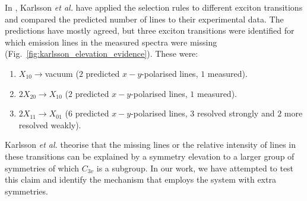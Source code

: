 In \cite{karlsson}, Karlsson \textit{et al.} have applied the selection rules to different exciton transitions and compared the predicted number of lines to their experimental data. The predictions have mostly agreed, but three exciton transitions were identified for which emission lines in the measured spectra were missing (Fig.~\ref{fig:karlsson_elevation_evidence}). These were:
\begin{enumerate}
\item $X_{10}\to $vacuum ($2$ predicted $x-y$-polarised lines, $1$ measured).
\item $2X_{20}\to X_{10}$ ($2$ predicted $x-y$-polarised lines, $1$ measured).
\item $2X_{11}\to X_{01}$ ($6$ predicted $x-y$-polarised lines, $3$ resolved strongly and $2$ more resolved weakly).
\end{enumerate}
Karlsson \textit{et al.} theorise that the missing lines or the relative intensity of lines in these transitions can be explained by a symmetry elevation to a larger group of symmetries of which $C_{3v}$ is a subgroup. In our work, we have attempted to test this claim and identify the mechanism that employs the system with extra symmetries.\\\hfill\\
